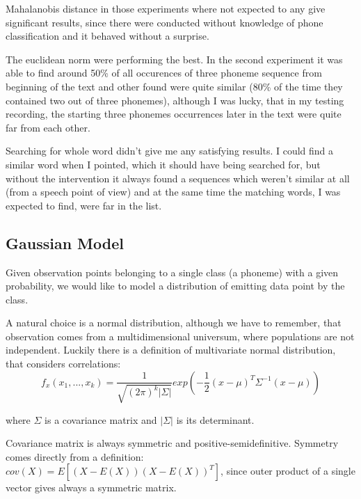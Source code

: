 \documentclass[12pt,a4paper,english]{article}
\begin{document}
Mahalanobis distance in those experiments where not expected to any give significant results,
since there were conducted without knowledge of phone classification and it behaved without a surprise. \newline


The euclidean norm were performing the best. \newline
In the second experiment it was able to find around 50\% of all occurences of three phoneme sequence from beginning of the text and other found were quite similar (80\% of the time they contained two out of three phonemes), although I was lucky, that in my testing recording, the starting three phonemes occurrences later in the text were quite far from each other. \newline


Searching for whole word didn't give me any satisfying results. I could find a similar word when I pointed, which it should have being searched for,
but without the intervention it always found a sequences which weren't similar at all (from a speech point of view) and at the same time the matching words, I was expected to find, were far in the list.

\newpage
\subsection{Gaussian Model}

Given observation points belonging to a single class (a phoneme) with a given probability,
we would like to model a distribution of emitting data point by the class. \newline


A natural choice is a normal distribution, although we have to remember, that observation comes from a multidimensional universum, where populations are not independent. \newline
Luckily there is a definition of multivariate normal distribution, that considers correlations:
\begin{equation}
    f_x(x_1,...,x_k) = \frac{1}{\sqrt{(2\pi)^k |{\Sigma}| }}exp(-\frac{1}{2}(x-\mu)^T{\Sigma}^{-1}(x-\mu))
\end{equation}
                       
where $\Sigma$ is a covariance matrix and $|\Sigma|$ is its determinant. \newline


Covariance matrix is always symmetric and positive-semidefinitive.\newline
Symmetry comes directly from a definition: $cov(X) = E[(X - E(X))(X - E(X))^T]$, since outer product of a single vector gives always a symmetric matrix. \newline
\end{document}
